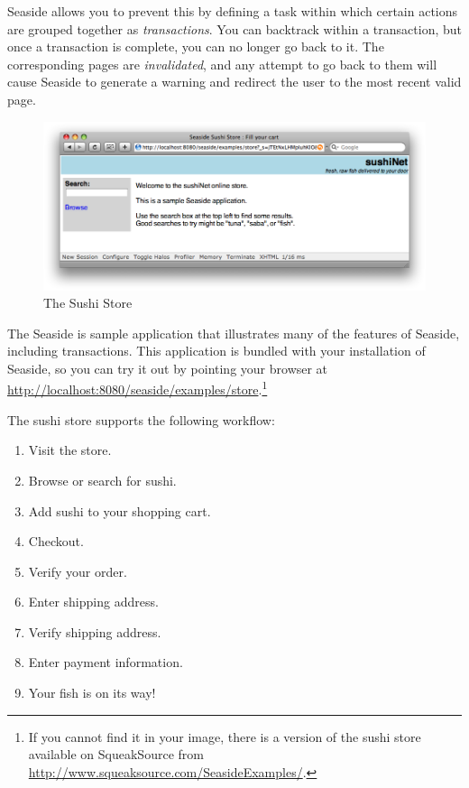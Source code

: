 \documentclass[a4paper,10pt,twoside]{book}
\begin{document}
Seaside allows you to prevent this by defining a task within which certain actions are grouped together as \emph{transactions}.
You can backtrack within a transaction, but once a transaction is complete, you can no longer go back to it.
The corresponding pages are \emph{invalidated}, and any attempt to go back to them will cause Seaside to generate a warning and redirect the user to the most recent valid page.

\begin{figure}[ht]
\begin{center}
\includegraphics[width=\textwidth]{sushiStore}
\caption{The Sushi Store}
\end{center}
\end{figure}

The Seaside  is sample application that illustrates many of the features of Seaside, including transactions.
This application is bundled with your installation of Seaside, so you can try it out by pointing your browser at
\url{http://localhost:8080/seaside/examples/store}.\footnote{If you cannot find it in your image, there is a version of the sushi store available on SqueakSource from \url{http://www.squeaksource.com/SeasideExamples/}.}

The sushi store supports the following workflow:
\begin{enumerate}[itemsep=0pt]
  \item Visit the store.
  \item Browse or search for sushi.
  \item Add sushi to your shopping cart.
  \item Checkout.
  \item Verify your order.
  \item Enter shipping address.
  \item Verify shipping address.
  \item Enter payment information.
  \item Your fish is on its way!
\end{enumerate}
\end{document}
